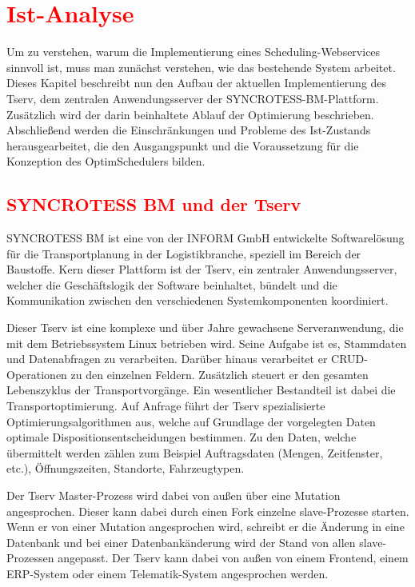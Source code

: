 \chapter{\textcolor{red}{Ist-Analyse}}
Um zu verstehen, warum die Implementierung eines Scheduling-Webservices sinnvoll ist, muss man zunächst verstehen, wie das bestehende System arbeitet. Dieses Kapitel beschreibt nun den Aufbau der aktuellen Implementierung des Tserv, dem zentralen Anwendungsserver der SYNCROTESS-BM-Plattform. Zusätzlich wird der darin beinhaltete Ablauf der Optimierung beschrieben. Abschließend werden die Einschränkungen und Probleme des Ist-Zustands herausgearbeitet, die den Ausgangspunkt und die Voraussetzung für die Konzeption des OptimSchedulers bilden.

\section{\textcolor{red}{SYNCROTESS BM und der Tserv}}
SYNCROTESS BM ist eine von der INFORM GmbH entwickelte Softwarelösung für die Transportplanung in der Logistikbranche, speziell im Bereich der Baustoffe. Kern dieser Plattform ist der Tserv, ein zentraler Anwendungsserver, welcher die Geschäftslogik der Software beinhaltet, bündelt und die Kommunikation zwischen den verschiedenen Systemkomponenten koordiniert.

Dieser Tserv ist eine komplexe und über Jahre gewachsene Serveranwendung, die mit dem Betriebssystem Linux betrieben wird. Seine Aufgabe ist es, Stammdaten und Datenabfragen zu verarbeiten. Darüber hinaus verarbeitet er CRUD-Operationen zu den einzelnen Feldern. Zusätzlich steuert er den gesamten Lebenszyklus der Transportvorgänge. Ein wesentlicher Bestandteil ist dabei die Transportoptimierung. Auf Anfrage führt der Tserv spezialisierte Optimierungsalgorithmen aus, welche auf Grundlage der vorgelegten Daten optimale Dispositionsentscheidungen bestimmen. Zu den Daten, welche übermittelt werden zählen zum Beispiel Auftragsdaten (Mengen, Zeitfenster, etc.), Öffnungszeiten, Standorte, Fahrzeugtypen.



Der Tserv Master-Prozess wird dabei von außen über eine Mutation angesprochen. Dieser kann dabei durch einen Fork einzelne slave-Prozesse starten. Wenn er von einer Mutation angesprochen wird, schreibt er die Änderung in eine Datenbank und bei einer Datenbankänderung wird der Stand von allen slave-Prozessen angepasst. Der Tserv kann dabei von außen von einem Frontend, einem ERP-System oder einem Telematik-System angesprochen werden.

